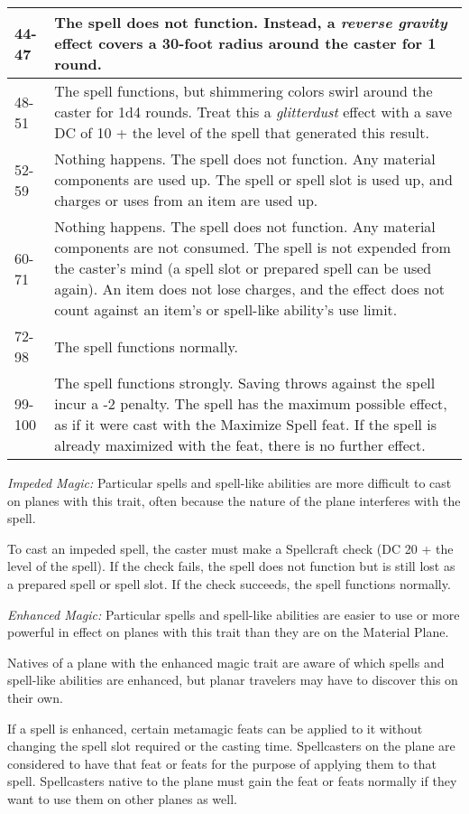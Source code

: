 \documentclass{article}
\begin{document}
\begin{tabular}{|>{\raggedright}p{24pt}|>{\raggedright}p{302pt}|}
\hline
44-47 & The spell does not function. Instead, a \textit{reverse gravity }effect 
covers a 30-foot radius around the caster for 1 round. \tabularnewline
\hline
48-51 & The spell functions, but shimmering colors swirl around the caster for 
1d4 rounds. Treat this a \textit{glitterdust }effect with a save DC of 10 + the 
level of the spell that generated this result.\tabularnewline
\hline
52-59 & Nothing happens. The spell does not function. Any material components are 
used up. The spell or spell slot is used up, and charges or uses from an item are 
used up.\tabularnewline
\hline
60-71 & Nothing happens. The spell does not function. Any material components are 
not consumed. The spell is not expended from the caster's mind (a spell slot or 
prepared spell can be used again). An item does not lose charges, and the effect 
does not count against an item's or spell-like ability's use limit.\tabularnewline
\hline
72-98 & The spell functions normally.\tabularnewline
\hline
99-100 & The spell functions strongly. Saving throws against the spell incur a 
-2 penalty. The spell has the maximum possible effect, as if it were cast with 
the Maximize Spell feat. If the spell is already maximized with the feat, there 
is no further effect. \tabularnewline
\hline
\end{tabular}

\vspace{12pt}
\textit{Impeded Magic:} Particular spells and spell-like abilities are more difficult 
to cast on planes with this trait, often because the nature of the plane interferes 
with the spell.

To cast an impeded spell, the caster must make a Spellcraft check (DC 20 + the 
level of the spell). If the check fails, the spell does not function but is still 
lost as a prepared spell or spell slot. If the check succeeds, the spell functions 
normally.

\textit{Enhanced Magic:} Particular spells and spell-like abilities are easier 
to use or more powerful in effect on planes with this trait than they are on the 
Material Plane.

Natives of a plane with the enhanced magic trait are aware of which spells and 
spell-like abilities are enhanced, but planar travelers may have to discover this 
on their own.

If a spell is enhanced, certain metamagic feats can be applied to it without changing 
the spell slot required or the casting time. Spellcasters on the plane are considered 
to have that feat or feats for the purpose of applying them to that spell. Spellcasters 
native to the plane must gain the feat or feats normally if they want to use them 
on other planes as well.
\end{document}
